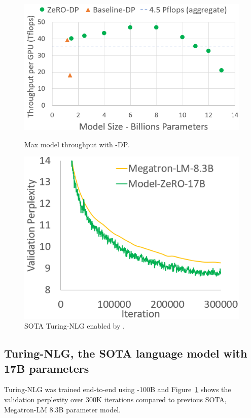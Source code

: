 \begin{figure}
   \begin{minipage}[b]{0.55\columnwidth}
    \centering
       \includegraphics[width=\textwidth]{max_data_parallel_throughput.PNG}
        \caption{Max model throughput with \name-DP.} \label{fig:dp_tput}
   \vspace{0.04in}
   \end{minipage}
   \quad
   \begin{minipage}[b]{0.4\columnwidth}
    \centering
       \includegraphics[width=\textwidth]{turing_nlg_17B.PNG}
        \caption{SOTA Turing-NLG enabled by \name.} \label{fig:turing_nlg_17B}
      \vspace{0.08in}
   \end{minipage}
\end{figure}

\subsection{Turing-NLG, the SOTA language model with 17B parameters}
Turing-NLG was trained end-to-end using \name-100B and Figure~\ref{fig:turing_nlg_17B} shows the validation perplexity over 300K iterations compared to previous SOTA, Megatron-LM 8.3B parameter model.